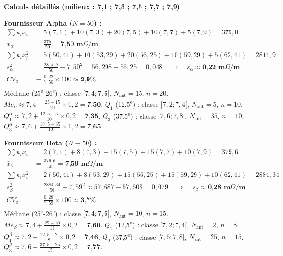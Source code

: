 \documentclass[11pt]{article}
\begin{document}
\begin{corrige}
\textbf{Calculs détaillés (milieux : 7,1 ; 7,3 ; 7,5 ; 7,7 ; 7,9)}

\textbf{Fournisseur Alpha ($N=50$) :}
\begin{align*}
\sum n_i x_i &= 5(7,1) + 10(7,3) + 20(7,5) + 10(7,7) + 5(7,9) = 375,0 \\
\bar{x}_\alpha &= \frac{375}{50} = \textbf{7,50 m$\Omega$/m} \\
\sum n_i x_i^2 &= 5(50,41) + 10(53,29) + 20(56,25) + 10(59,29) + 5(62,41) = 2814,9 \\
s_\alpha^2 &= \frac{2814,9}{50} - 7,50^2 = 56,298 - 56,25 = 0,048 \quad \Rightarrow \quad s_\alpha \approx \textbf{0,22 m$\Omega$/m} \\
CV_\alpha &= \frac{0,22}{7,50} \times 100 \approx \textbf{2,9\%}
\end{align*}
Médiane (25\textsuperscript{e}-26\textsuperscript{e}) : classe $[7,4;7,6[$, $N_{\text{ant}}=15$, $n=20$.
$Me_\alpha \approx 7,4 + \frac{25-15}{20} \times 0,2 = \textbf{7,50}$.
$Q_1$ (12,5\textsuperscript{e}) : classe $[7,2;7,4[$, $N_{\text{ant}}=5$, $n=10$.
$Q_1^\alpha \approx 7,2 + \frac{12,5-5}{10} \times 0,2 = \textbf{7,35}$.
$Q_3$ (37,5\textsuperscript{e}) : classe $[7,6;7,8[$, $N_{\text{ant}}=35$, $n=10$.
$Q_3^\alpha \approx 7,6 + \frac{37,5-35}{10} \times 0,2 = \textbf{7,65}$.

\textbf{Fournisseur Beta ($N=50$) :}
\begin{align*}
\sum n_i x_i &= 2(7,1) + 8(7,3) + 15(7,5) + 15(7,7) + 10(7,9) = 379,6 \\
\bar{x}_\beta &= \frac{379,6}{50} = \textbf{7,59 m$\Omega$/m} \\
\sum n_i x_i^2 &= 2(50,41) + 8(53,29) + 15(56,25) + 15(59,29) + 10(62,41) = 2884,34 \\
s_\beta^2 &= \frac{2884,34}{50} - 7,59^2 \approx 57,687 - 57,608 = 0,079 \quad \Rightarrow \quad s_\beta \approx \textbf{0,28 m$\Omega$/m} \\
CV_\beta &= \frac{0,28}{7,59} \times 100 \approx \textbf{3,7\%}
\end{align*}
Médiane (25\textsuperscript{e}-26\textsuperscript{e}) : classe $[7,4;7,6[$, $N_{\text{ant}}=10$, $n=15$.
$Me_\beta \approx 7,4 + \frac{25-10}{15} \times 0,2 = \textbf{7,60}$.
$Q_1$ (12,5\textsuperscript{e}) : classe $[7,2;7,4[$, $N_{\text{ant}}=2$, $n=8$.
$Q_1^\beta \approx 7,2 + \frac{12,5-2}{8} \times 0,2 = \textbf{7,46}$.
$Q_3$ (37,5\textsuperscript{e}) : classe $[7,6;7,8[$, $N_{\text{ant}}=25$, $n=15$.
$Q_3^\beta \approx 7,6 + \frac{37,5-25}{15} \times 0,2 = \textbf{7,77}$.


\end{corrige}
\end{document}
